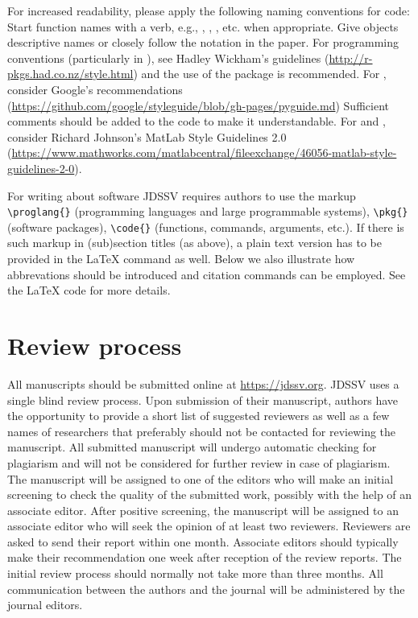 \documentclass[article]{jdssv}
\begin{document}
\begin{sloppypar}
For increased readability, please apply the following naming conventions for code: Start function names with a verb, e.g., , , , etc. when appropriate. Give  objects descriptive names or closely follow the notation in the paper.
For programming conventions (particularly in ), see Hadley Wickham's guidelines (\url{http://r-pkgs.had.co.nz/style.html}) and the use of the  package is recommended. For , consider Google's recommendations (\url{https://github.com/google/styleguide/blob/gh-pages/pyguide.md}) Sufficient comments should be added to the code to make it understandable. For  and  \citep{matlab}, consider Richard Johnson's MatLab Style Guidelines 2.0 (\url{https://www.mathworks.com/matlabcentral/fileexchange/46056-matlab-style-guidelines-2-0}).
\end{sloppypar}

For writing about software JDSSV requires authors to use the markup
\verb|\proglang{}| (programming languages and large programmable systems), \verb|\pkg{}| (software packages), \verb|\code{}| (functions, commands, arguments, etc.). If there is such markup in (sub)section titles (as above), a plain text version has to be provided in the {\LaTeX} command as well. Below we also illustrate how abbrevations should be introduced and citation commands can be employed. See the {\LaTeX} code for more details.

\section{Review process}

All manuscripts should be submitted online at  \url{https://jdssv.org}. JDSSV uses a single blind review process. Upon submission of their manuscript, authors have the opportunity to provide a short list of suggested reviewers as well as a few names of researchers that preferably should not be contacted for reviewing the manuscript.  All submitted manuscript will undergo automatic checking for plagiarism and will not be considered for further review in case of plagiarism. The manuscript will be assigned to one of the editors who will make an initial screening to check the quality of the submitted work, possibly with the help of an associate editor. After positive screening, the manuscript will be assigned to an associate editor who will seek the opinion of at least two reviewers. Reviewers are asked to send their report within one month. Associate editors should typically make their recommendation one week after reception of the review reports. The initial review process should normally not take more than three months. All communication between the authors and the journal will be administered by the journal editors.  
\end{document}
